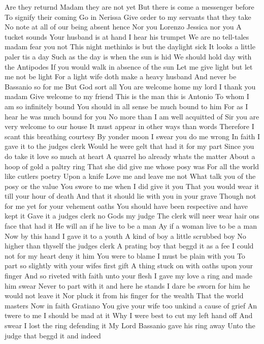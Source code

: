 Are they returnd
Madam they are not yet
But there is come a messenger before
To signify their coming
Go in Nerissa
Give order to my servants that they take
No note at all of our being absent hence
Nor you Lorenzo Jessica nor you
A tucket sounds
Your husband is at hand I hear his trumpet
We are no tell-tales madam fear you not
This night methinks is but the daylight sick
It looks a little paler tis a day
Such as the day is when the sun is hid
We should hold day with the Antipodes
If you would walk in absence of the sun
Let me give light but let me not be light
For a light wife doth make a heavy husband
And never be Bassanio so for me
But God sort all You are welcome home my lord
I thank you madam Give welcome to my friend
This is the man this is Antonio
To whom I am so infinitely bound
You should in all sense be much bound to him
For as I hear he was much bound for you
No more than I am well acquitted of
Sir you are very welcome to our house
It must appear in other ways than words
Therefore I scant this breathing courtesy
By yonder moon I swear you do me wrong
In faith I gave it to the judges clerk
Would he were gelt that had it for my part
Since you do take it love so much at heart
A quarrel ho already whats the matter
About a hoop of gold a paltry ring
That she did give me whose posy was
For all the world like cutlers poetry
Upon a knife Love me and leave me not
What talk you of the posy or the value
You swore to me when I did give it you
That you would wear it till your hour of death
And that it should lie with you in your grave
Though not for me yet for your vehement oaths
You should have been respective and have kept it
Gave it a judges clerk no Gods my judge
The clerk will neer wear hair ons face that had it
He will an if he live to be a man
Ay if a woman live to be a man
Now by this hand I gave it to a youth
A kind of boy a little scrubbed boy
No higher than thyself the judges clerk
A prating boy that beggd it as a fee
I could not for my heart deny it him
You were to blame I must be plain with you
To part so slightly with your wifes first gift
A thing stuck on with oaths upon your finger
And so riveted with faith unto your flesh
I gave my love a ring and made him swear
Never to part with it and here he stands
I dare be sworn for him he would not leave it
Nor pluck it from his finger for the wealth
That the world masters Now in faith Gratiano
You give your wife too unkind a cause of grief
An twere to me I should be mad at it
Why I were best to cut my left hand off
And swear I lost the ring defending it
My Lord Bassanio gave his ring away
Unto the judge that beggd it and indeed
